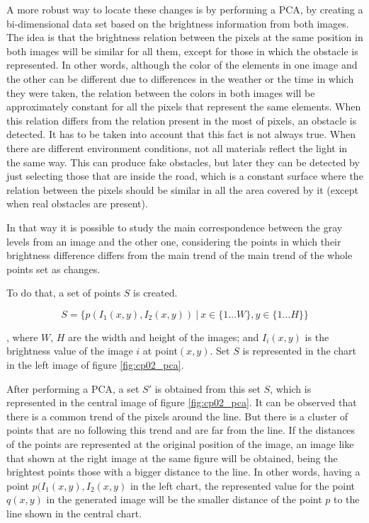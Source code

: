 A more robust way to locate these changes is by performing a \ac{PCA}, by creating a bi-dimensional data set based on the brightness information from both images. The idea is that the brightness relation between the pixels at the same position in both images will be similar for all them, except for those in which the obstacle is represented. In other words, although the color of the elements in one image and the other can be different due to differences in the weather or the time in which they were taken, the relation between the colors in both images will be approximately constant for all the pixels that represent the same elements. When this relation differs from the relation present in the most of pixels, an obstacle is detected. It has to be taken into account that this fact is not always true. When there are different environment conditions, not all materials reflect the light in the same way. This can produce fake obstacles, but later they can be detected by just selecting those that are inside the road, which is a constant surface where the relation between the pixels should be similar in all the area covered by it (except when real obstacles are present).

In that way it is possible to study the main correspondence between the gray levels from an image and the other one, considering the points in which their brightness difference differs from the main trend of the main trend of the whole points set as changes.

To do that, a set of points $S$ is created.

\begin{equation}\label{eq:cp02_brightness_relation}
S = \{ p(I_1(x, y), I_2(x,y)) ~|~ x \in \{1 \dots W\}, y \in \{1 \dots H\} \}
\end{equation}

, where $W$, $H$ are the width and height of the images; and $I_i(x, y)$ is the brightness value of the image $i$ at point$(x,y)$. Set $S$ is represented in the chart in the left image of figure \ref{fig:cp02_pca}.

After performing a PCA, a set $S'$ is obtained from this set $S$, which is represented in the central image of figure \ref{fig:cp02_pca}. It can be observed that there is a common trend of the pixels around the line. But there is a cluster of points that are no following this trend and are far from the line. If the distances of the points are represented at the original position of the image, an image like that shown at the right image at the same figure will be obtained, being the brightest points those with a bigger distance to the line. In other words, having a point $p(I_1(x, y), I_2(x, y)$ in the left chart, the represented value for the point $q(x, y)$ in the generated image will be the smaller distance of the point $p$ to the line shown in the central chart.

